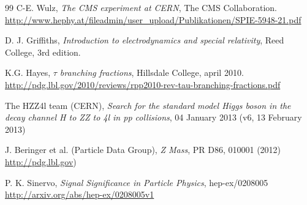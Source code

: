 \documentclass[a4paper,12pt]{article}
\begin{document}
\begin{thebibliography}{99}
	 C-E. Wulz, \emph{The CMS experiment at CERN}, The CMS Collaboration.
	\\ \url{http://www.hephy.at/fileadmin/user_upload/Publikationen/SPIE-5948-21.pdf}

	 D. J. Griffiths, \emph{Introduction to electrodynamics and special relativity}, Reed College, 3rd edition.
		
	 	K.G. Hayes, \emph{$\tau$ branching fractions}, Hillsdale College, april 2010.
	\url{http://pdg.lbl.gov/2010/reviews/rpp2010-rev-tau-branching-fractions.pdf}
		
	 The HZZ4l team (CERN), \emph{Search for the standard model Higgs boson in the decay channel H to ZZ to 4l in pp collisions}, 04 January 2013 (v6, 13 February 2013)

	 J. Beringer et al. (Particle Data Group), \emph{Z Mass}, PR D86, 010001 (2012)  \\ \url{http://pdg.lbl.gov})
	 
	 P. K. Sinervo, \emph{Signal Significance in Particle Physics}, hep-ex/0208005 \\
	 \url{http://arxiv.org/abs/hep-ex/0208005v1}

\end{thebibliography} 
\end{document}
